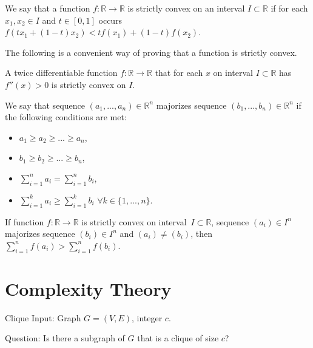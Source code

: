 \begin{defn}
We say that a function $f:\mathbb{R}\rightarrow\mathbb{R}$ is strictly convex on an interval $I \subset \mathbb{R}$
if for each $x_1, x_2 \in I$ and $t \in [0,1]$ occurs $f(t x_1 + (1-t) x_2) < tf(x_1) + (1-t)f(x_2)$.
\end{defn}

The following is a convenient way of proving that a function is strictly convex.

\begin{prp}
A twice differentiable function $f:\mathbb{R}\rightarrow\mathbb{R}$
that for each $x$ on interval $I \subset \mathbb{R}$ has $f''(x) > 0$
is strictly convex on $I$.
\end{prp}

\begin{defn}
We say that sequence $(a_1, ..., a_n) \in \mathbb{R}^n$ majorizes sequence $(b_1, ..., b_n) \in \mathbb{R}^n$
if the following conditions are met:
\begin{itemize}
	\item $a_1 \geq a_2 \geq ... \geq a_n$,
	\item $b_1 \geq b_2 \geq ... \geq b_n$,
	\item $\sum_{i=1}^n a_i = \sum_{i=1}^n b_i$,
	\item $\sum_{i=1}^k a_i \geq \sum_{i=1}^k b_i$ $\forall k \in \{ 1, ..., n\}$.
\end{itemize}
\end{defn}

\begin{thm} \label{thm:Kar}
If function $f:\mathbb{R}\rightarrow\mathbb{R}$ is strictly convex on interval~$I \subset \mathbb{R}$,
sequence $(a_i) \in I^n$ majorizes sequence $(b_i) \in I^n$ and $(a_i) \neq (b_i)$, then
$\sum_{i=1}^n f(a_i) > \sum_{i=1}^n f(b_i)$.
\end{thm}


\section{Complexity Theory}




\begin{problem}{Clique}
    Input: Graph $G = (V, E)$, integer $c$.

    Question: Is there a subgraph of $G$ that is a clique of size $c$?
\end{problem}

